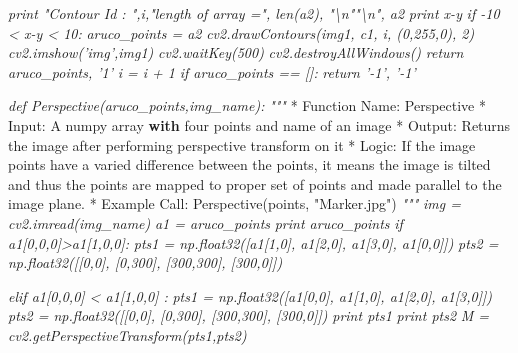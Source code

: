 \documentclass[]{article}
\newenvironment{Shaded}{}{}
\newcommand{\StringTok}[1]{\textcolor[rgb]{0.25,0.44,0.63}{{#1}}}
\newcommand{\CommentTok}[1]{\textcolor[rgb]{0.38,0.63,0.69}{\textit{{#1}}}}
\newcommand{\ControlFlowTok}[1]{\textcolor[rgb]{0.00,0.44,0.13}{\textbf{{#1}}}}
\newcommand{\OperatorTok}[1]{\textcolor[rgb]{0.40,0.40,0.40}{{#1}}}
\newcommand{\BuiltInTok}[1]{{#1}}
\newcommand{\NormalTok}[1]{{#1}}
\begin{document}
\begin{Shaded}
\begin{Highlighting}[]
\CommentTok{                    print "Contour Id : ",i,"length of array =", len(a2), "\textbackslash{}n""\textbackslash{}n", a2}
\CommentTok{                    print x-y}
\CommentTok{                    if -10 < x-y < 10:}
\CommentTok{                        aruco_points = a2}
\CommentTok{                        cv2.drawContours(img1, c1, i, (0,255,0), 2)}
\CommentTok{                        cv2.imshow('img',img1)}
\CommentTok{                        cv2.waitKey(500)}
\CommentTok{                        cv2.destroyAllWindows()}
\CommentTok{                        return aruco_points, '1'}
\CommentTok{        i = i + 1}
\CommentTok{                                                        }
\CommentTok{            }
\CommentTok{                        }
\CommentTok{    if aruco_points == []:}
\CommentTok{        return '-1', '-1'}
\CommentTok{            }

\CommentTok{    }
\CommentTok{    }
\CommentTok{def Perspective(aruco_points,img_name):}
\CommentTok{    """}
    \OperatorTok{*} \NormalTok{Function Name:    Perspective}
    \OperatorTok{*} \NormalTok{Input:        A numpy array }\ControlFlowTok{with} \NormalTok{four points }\OperatorTok{and} \NormalTok{name of an image}
    \OperatorTok{*} \NormalTok{Output:       Returns the image after performing perspective transform}
                        \NormalTok{on it}
    \OperatorTok{*} \NormalTok{Logic:        If the image points have a varied difference between the points, it means the image }\OperatorTok{is}
                        \NormalTok{tilted }\OperatorTok{and} \NormalTok{thus the points are mapped to proper }\BuiltInTok{set} \NormalTok{of points }\OperatorTok{and} \NormalTok{made parallel to the                                  }
                        \NormalTok{image plane.  }
    \OperatorTok{*} \NormalTok{Example Call: Perspective(points, }\StringTok{"Marker.jpg"}\NormalTok{)}
    \CommentTok{"""}
\CommentTok{    img = cv2.imread(img_name)}
\CommentTok{    a1 = aruco_points}
\CommentTok{    print aruco_points}
\CommentTok{    if a1[0,0,0]>a1[1,0,0]:}
\CommentTok{        pts1 = np.float32([a1[1,0], a1[2,0], a1[3,0], a1[0,0]])}
\CommentTok{        pts2 = np.float32([[0,0], [0,300], [300,300], [300,0]])}

\CommentTok{    elif a1[0,0,0] < a1[1,0,0] :}
\CommentTok{        pts1 = np.float32([a1[0,0], a1[1,0], a1[2,0], a1[3,0]])}
\CommentTok{        pts2 = np.float32([[0,0], [0,300], [300,300], [300,0]])}
\CommentTok{    print pts1}
\CommentTok{    print pts2}
\CommentTok{    M = cv2.getPerspectiveTransform(pts1,pts2)}


\end{Highlighting}
\end{Shaded}
\end{document}
